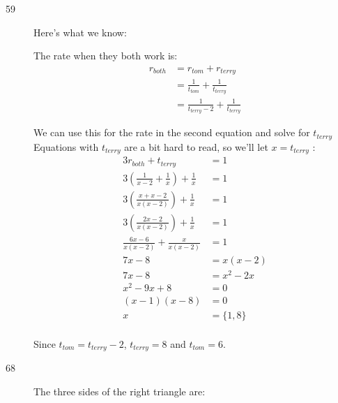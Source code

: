 \documentclass[fleqn,addpoints]{exam}
\begin{document}
\begin{description}
\item[59]
Here's what we know:

The rate when they both work is: 
\begin{align*}
  r_{both} &= r_{tom} + r_{terry} \\
  &= \frac{1}{t_{tom}} + \frac{1}{t_{terry}} \\
  &= \frac{1}{t_{terry} - 2} + \frac{1}{t_{terry}} 
\end{align*}

We can use this for the rate in the second equation and solve for $t_{terry}$  Equations with $t_{terry}$ are a bit hard to read, so we'll let $x = t_{terry}$ :
\begin{align*}
  3r_{both} + t_{terry} &= 1 \\
  3 \left( \frac{1}{x - 2} + \frac{1}{x} \right ) + \frac{1}{x} &= 1 \\
  3 \left( \frac{x + x - 2}{x(x - 2)} \right ) + \frac{1}{x} &= 1 \\
  3 \left( \frac{2x - 2}{x(x - 2)} \right ) + \frac{1}{x} &= 1 \\
  \frac{6x - 6}{x(x - 2)} + \frac{x}{x(x-2)} &= 1 \\
  7x - 8 &= x(x - 2) \\
  7x - 8 &= x^2 - 2x \\
  x^2 - 9x + 8 &= 0 \\
  (x-1)(x-8) &= 0 \\
  x &= \{ 1, 8 \} \\
\end{align*}

Since $t_{tom} = t_{terry} - 2$, $t_{terry} = 8$ and $t_{tom} = 6$.

\item[68]

The three sides of the right triangle are:


\end{description}
\end{document}
